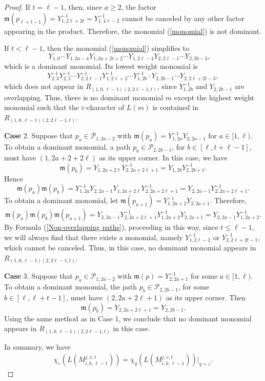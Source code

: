 \documentclass[10pt,a4paper]{amsart}
\begin{document}
\begin{proof}
If $t=\ell-1$, then, since $a\geq 2$, the factor $\mathfrak{m}(p_{\ell+t-1})=Y^{-1}_{1,2 \ell+2t}=Y^{-1}_{1,4 \ell-2}$ cannot be canceled by any other factor appearing in the product. Therefore, the monomial (\ref{monomial}) is not dominant.

If $t<\ell-1$, then the monomial (\ref{monomial}) simplifies to 
\[
Y_{1,0}\cdots Y_{1,2a-4}Y_{1,2a+2t+2}\cdots Y_{1,2\ell-4}Y_{2,2 \ell-1}\cdots Y_{2,2b-3}, \quad 
\]
which is a dominant monomial. Its lowest weight monomial is  
\[
Y^{-1}_{2,3} Y^{-1}_{2,5}\cdots Y^{-1}_{2,2 \ell-1} Y^{-1}_{1,2 \ell+2}\cdots Y^{-1}_{1,2b} \cdot Y_{2,2b-1}\cdots Y_{2,2 \ell+2t-3},
\]
which does not appear in $R_{(1,0,\ell-1)(2,2\ell-1,t)}$, since $Y^{-1}_{1,2b}$ and $Y_{2,2b-1}$ are overlapping. Thus, there is no dominant monomial $m$ except the highest weight monomial such that the $\varepsilon$-character of $L(m)$ is contained in $R_{(1,0,\ell-1)(2,2\ell-1,t)}$.


{\bf Case} 2. Suppose that $p_a\in \mathscr{P}_{1,2a-2}$ with $\mathfrak{m}(p_a)=Y^{-1}_{1,2a}Y_{2,2a-1}$ for $a\in[1, \ell)$. To obtain a dominant monomial, a path $p_b\in \mathscr{P}_{2,2b-1}$, for $b\in[\ell,t+\ell-1]$, must have $(1,2a+2+2 \ell)$ as its upper corner. In this case, we have 
\[
\mathfrak{m}(p_b)=Y_{1,2a+2 \ell}Y^{-1}_{2,2a+2 \ell+1}=Y_{1,2b}Y^{-1}_{2, 2b+1}.
\]
Hence
\[
\mathfrak{m}(p_a)\mathfrak{m}(p_b)=Y^{-1}_{1,2a}Y_{2,2a-1}Y_{1,2a+2 \ell}Y^{-1}_{2,2a+2 \ell+1}=Y_{2,2a-1}Y^{-1}_{2,2a+2 \ell+1}.
\]
To obtain a dominant monomial, let $\mathfrak{m}(p_{a+1})=Y^{-1}_{1,2a+2}Y_{2,2a+1}$. Therefore,
\[
\mathfrak{m}(p_a)\mathfrak{m}(p_b)\mathfrak{m}(p_{a+1})=Y_{2,2a-1}Y^{-1}_{2,2a+2 \ell+1}Y^{-1}_{1,2a+2}Y_{2,2a+1}=Y_{2,2a-1}Y^{-1}_{1,2a+2}.
\]
By Formula (\ref{Non-overlapping paths}), proceeding in this way, since $t\leq \ell-1$, we will always find that there exists a monomial, namely $Y^{-1}_{1,2 \ell-2}$ or $Y^{-1}_{2,2\ell+2t-1}$, which cannot be canceled. Thus, in this case, no dominant monomial appears in $R_{(1,0,\ell-1)(2,2\ell-1,t)}$.

{\bf Case} 3. Suppose that $p_a\in \mathscr{P}_{1,2a-2}$ with $\mathfrak{m}(p)=Y^{-1}_{2,2a+1}$ for some $a\in[1, \ell)$. To obtain a dominant monomial, the path $p_b\in \mathscr{P}_{2,2b-1}$, for some $b\in[\ell,\ell+t-1]$, must have $(2,2a+2\ell+1)$ as its upper corner. Then 
\[
\mathfrak{m}(p_b)=Y_{2,2a+2\ell+1}=Y_{2,2b-1}.
\]
Using the same method as in Case 1, we conclude that no dominant monomial appears in $R_{(1,0,\ell-1)(2,2\ell-1,t)}$ in this case.

In summary, we have
\begin{align*}
\chi_\varepsilon(L(M^{j,v,t}_{i,k,\ell-1}))=\chi_q(L(M^{j,v,t}_{i,k,\ell-1}))|_{q=\varepsilon}.
\end{align*}
\end{proof}  
\end{document}
